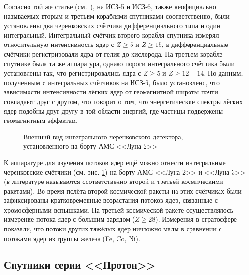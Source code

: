 \documentclass[12pt,a4paper]{report} %
\begin{document}
Согласно той же статье (см.~\cite{Ginzburg}), на ИСЗ-5 и ИСЗ-6, также неофициально называемых вторым и третьим кораблями-спутниками соответственно, были установлены два черенковских счётчика дифференциального типа и один интегральный. Интегральный счётчик второго корабля-спутника измерял относительную интенсивность ядер с $Z\geq5$ и $Z\geq15$, а дифференциальные счётчики регистрировали ядра от гелия до кислорода. 
На третьем корабле-спутнике была та же аппаратура, однако пороги интегрального счётчика были установлены так, что регистрировались ядра с $Z\geq5$ и $Z\geq12-14$.
По данным, полученным с интегральных счётчиков на ИСЗ-6, было установлено, что зависимости интенсивности лёгких ядер от геомагнитной широты почти совпадают друг с другом, что говорит о том, что энергетические спектры лёгких ядер подобны друг другу в той области энергий, где частицы подвержены геомагнитным эффектам. 
\begin{figure}[th]
	\noindent{}
	\caption{Внешний вид интегрального черенковского детектора, установленного на борту АМС <<Луна-2>>}
	\label{picLunik}
\end{figure}
К аппаратуре для изучения потоков ядер ещё можно отнести интегральные черенковские счётчики (см. рис. \ref{picLunik}) на борту АМС <<Луна-2>> и <<Луна-3>> (в литературе называются соответственно второй и третьей космическими ракетами). Во время полёта второй космической ракеты на этих счётчиках были зафиксированы кратковременные возрастания потоков ядер, связанные с хромосферными вспышками. 
На третьей космической ракете осуществлялось измерение потока ядер с большим зарядом ($Z\geq28$). 
Измерения в стратосфере показали, что потоки других тяжёлых ядер ничтожно малы в сравнении с потоками ядер из группы железа (Fe, Co, Ni).
\subsection{Спутники серии <<Протон>>}
\end{document}
